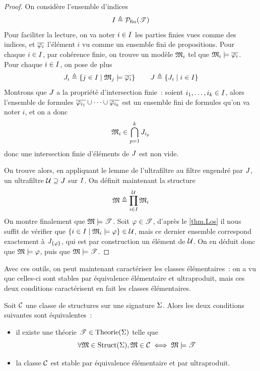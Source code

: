 \begin{proof}
  On considère l'ensemble d'indices
  \[I \triangleq \mathcal{P}_{\mathrm{fin}}(\mathscr T)\]
  Pour faciliter la lecture, on va noter $i \in I$ les parties finies vues
  comme des indices, et $\overline{\varphi_i}$ l'élément $i$ vu comme un ensemble fini
  de propositions.
  Pour chaque $i \in I$, par cohérence finie, on trouve un modèle
  $\mathfrak{M}_i$ tel que $\mathfrak{M}_i\models\overline{\varphi_i}$. Pour chaque
  $i \in I$, on pose de plus
  \[J_i \triangleq \left\{ j \in I \;\middle\vert\; \mathfrak{M}_j\models\overline{\varphi_i} \right\}\qquad
  J \triangleq \left\{ J_i \;\middle\vert\; i \in I \right\}\]
  Montrons que $J$ a la propriété d'intersection finie~: soient
  $i_1,\ldots,i_k \in I$, alors l'ensemble de formules
  $\overline{\varphi_{i_1}}\cup\cdots\cup\overline{\varphi_{i_k}}$ est un ensemble fini de
  formules qu'on va noter $i$, et on a donc
  \[\mathfrak{M}_i\in \bigcap_{p = 1}^k J_{i_p}\]
  donc une intersection finie d'éléments de $J$ est non vide.

  On trouve alors, en appliquant le lemme de l'ultrafiltre au filtre engendré
  par $J$, un ultrafiltre $\mathcal{U}\supseteq J$ sur $I$. On
  définit maintenant la structure
  \[\mathfrak{M} \triangleq \prod_{i \in I}^{\mathcal{U}} \mathfrak{M}_i\]
  On montre finalement que $\mathfrak{M}\models\mathscr T$. Soit $\varphi \in \mathscr T$,
  d'après le \cref{thm.Los} il nous suffit de vérifier que
  $\left\{ i \in I \;\middle\vert\; \mathfrak{M}_i\models \varphi \right\}\in \mathcal{U}$, mais ce dernier
  ensemble correspond exactement à $J_{\{\varphi\}}$, qui est par
  construction un élément de $\mathcal{U}$. On en déduit donc que
  $\mathfrak{M}\models\varphi$, puis que $\mathfrak{M}\models\mathscr T$.
\end{proof}

Avec ces outils, on peut maintenant caractériser les classes élémentaires~:
on a vu que celles-ci sont stables par équivalence élémentaire et ultraproduit,
mais ces deux conditions caractérisent en fait les classes élémentaires.

\begin{theorem}
  Soit $\mathcal{C}$ une classe de structures sur une signature $\Sigma$. Alors les
  deux conditions suivantes sont équivalentes~:
  \begin{itemize}
  \item il existe une théorie $\mathscr T\in\operatorname{Theorie}(\Sigma)$ telle que
    \[\forall \mathfrak{M}\in\operatorname{Struct}(\Sigma), \mathfrak{M}\in\mathcal{C}\iff\mathfrak{M}\models\mathscr T\]
  \item la classe $\mathcal{C}$ est stable par équivalence élémentaire et par
    ultraproduit.
  \end{itemize}
\end{theorem}

